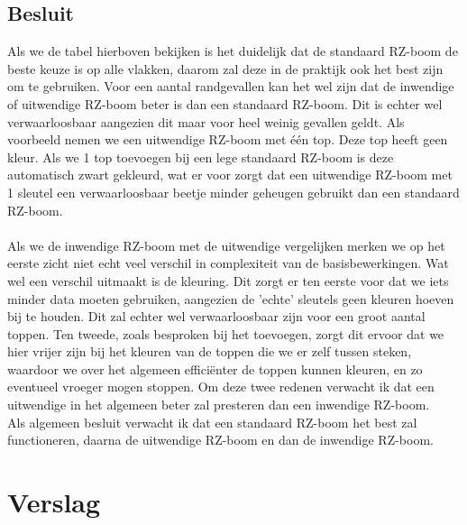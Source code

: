 \documentclass[11pt,a4paper]{report}
\begin{document}
\section{Besluit}
Als we de tabel hierboven bekijken is het duidelijk dat de standaard RZ-boom de beste keuze is op alle vlakken, daarom zal deze in de praktijk ook het best zijn om te gebruiken. Voor een aantal randgevallen kan het wel zijn dat de inwendige of uitwendige RZ-boom beter is dan een standaard RZ-boom. Dit is echter wel verwaarloosbaar aangezien dit maar voor heel weinig gevallen geldt. Als voorbeeld nemen we een uitwendige RZ-boom met \'e\'en top. Deze top heeft geen kleur. Als we 1 top toevoegen bij een lege standaard RZ-boom is deze automatisch zwart gekleurd, wat er voor zorgt dat een uitwendige RZ-boom met 1 sleutel een verwaarloosbaar beetje minder geheugen gebruikt dan een standaard RZ-boom.\\ \\
Als we de inwendige RZ-boom met de uitwendige vergelijken merken we op het eerste zicht niet echt veel verschil in complexiteit van de basisbewerkingen. Wat wel een verschil uitmaakt is de kleuring. Dit zorgt er ten eerste voor dat we iets minder data moeten gebruiken, aangezien de 'echte' sleutels geen kleuren hoeven bij te houden. Dit zal echter wel verwaarloosbaar zijn voor een groot aantal toppen. Ten tweede, zoals besproken bij het toevoegen, zorgt dit ervoor dat we hier vrijer zijn bij het kleuren van de toppen die we er zelf tussen steken, waardoor we over het algemeen effici\"enter de toppen kunnen kleuren, en zo eventueel vroeger mogen stoppen. Om deze twee redenen verwacht ik dat een uitwendige in het algemeen beter zal presteren dan een inwendige RZ-boom.\\
Als algemeen besluit verwacht ik dat een standaard RZ-boom het best zal functioneren, daarna de uitwendige RZ-boom en dan de inwendige RZ-boom.

\chapter{Verslag}
\end{document}
